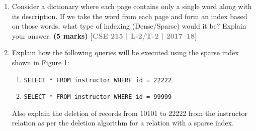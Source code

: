 \documentclass[12pt,a3paper]{article}
\newcommand{\yr}[1]{\hfill\textcolor{gray}{\small\textbf{[#1]}}}
\newcommand{\mk}[1]{\textcolor{orange!70!black}{\small\textbf{(#1 marks)}}}
\begin{document}
\begin{enumerate}
\begin{center}
\end{center}

\mk{20} \yr{CSE 303 | L-3/T-1 | 2014--15}

\item Consider a dictionary where each page contains only a single word along with its description. If we take the word from each page and form an index based on those words, what type of indexing (Dense/Sparse) would it be? Explain your answer.
\mk{5} \yr{CSE 215 | L-2/T-2 | 2017--18}

\item Explain how the following queries will be executed using the sparse index shown in Figure 1:
\begin{enumerate}
  \item \texttt{SELECT * FROM instructor WHERE id = 22222}
  \item \texttt{SELECT * FROM instructor WHERE id = 99999}
\end{enumerate}
Also explain the deletion of records from 10101 to 22222 from the instructor relation as per the deletion algorithm for a relation with a sparse index.

\begin{center}
      \begin{tikzpicture}[
        >=Stealth,
        cell/.style={
            draw, 
            minimum height=1.3em, 
            inner sep=4pt, 
            outer sep=0pt, 
            anchor=center, 
            font=\small
        },
        index_table/.style={
            matrix of nodes,
            nodes={cell},
            column 1/.style={nodes={text width=1.1cm, align=center}},
            column 2/.style={nodes={minimum width=0.5cm}},
            row sep=-\pgflinewidth,
            column sep=-\pgflinewidth
        },
        relation_table/.style={
            matrix of nodes,
            nodes={cell, fill=tableblue},
            column 1/.style={nodes={text width=1.2cm, align=left}},
            column 2/.style={nodes={text width=2cm, align=left}},
            column 3/.style={nodes={text width=2cm, align=left}},
            column 4/.style={nodes={text width=1.5cm, align=left}},
            column 5/.style={nodes={minimum width=0.5cm}},
            row sep=-\pgflinewidth,
            column sep=-\pgflinewidth
        }
    ]


\end{tikzpicture}
\end{center}
\end{enumerate}
\end{document}
